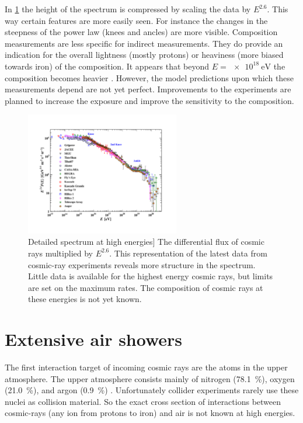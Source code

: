 In \cref{fig:PDG_28_8_all_particle_spectrum} the height of the spectrum is compressed by scaling the data by $E^{2.6}$. This way certain features are more easily seen. For instance the changes in the steepness of the power law (knees and ancles) are more visible. Composition measurements are less specific for indirect measurements. They do provide an indication for the overall lightness (mostly protons) or heaviness (more biased towards iron) of the composition. It appears that beyond $E = \SI{e18}{\eV}$ the composition becomes heavier \cite{abbasi2015combined}. However, the model predictions upon which these measurements depend are not yet perfect. Improvements to the experiments are planned to increase the exposure and improve the sensitivity to the composition.

\begin{figure}
    \centering
    \includegraphics[width=0.6\textwidth]
                    {plots/cosmic-rays/PDG_28_8_all_particle_spectrum}
    \caption{Detailed spectrum at high energies]
The differential flux of cosmic rays multiplied by $E^{2.6}$. This representation of the latest data from cosmic-ray experiments reveals more structure in the spectrum. Little data is available for the highest energy cosmic rays, but limits are set on the maximum rates. The composition of cosmic rays at these energies is not yet known.}
    \label{fig:PDG_28_8_all_particle_spectrum}
\end{figure}


\section{Extensive air showers}
\label{sec:cr:eas}

The first interaction target of incoming cosmic rays are the atoms in the upper atmosphere. The upper atmosphere consists mainly of nitrogen (\SI{78.1}{\percent}), oxygen (\SI{21.0}{\percent}), and argon (\SI{0.9}{\percent}) \cite{noaa1976atmosphere}. Unfortunately collider experiments rarely use these nuclei as collision material. So the exact cross section of interactions between cosmic-rays (any ion from protons to iron) and air is not known at high energies.

